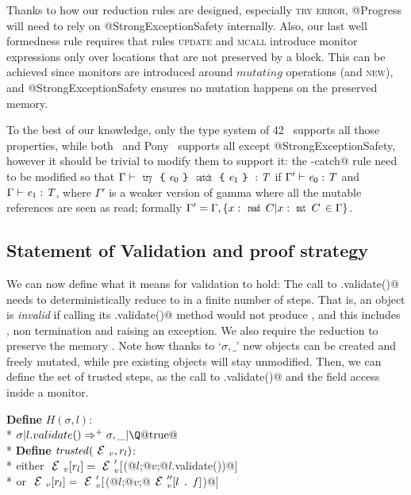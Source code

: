 Thanks to how our reduction rules are designed, especially \textsc{try error},
@Progress will need to rely on @StrongExceptionSafety internally.
Also, our last well formedness rule requires that 
rules \textsc{update} and \textsc{mcall} introduce
monitor expressions only over locations
that are not preserved by a \Q@try@ block.
This can be achieved since monitors are introduced
around $\mathit{mutating}$ operations
(and \textsc{new}),
and @StrongExceptionSafety ensures no mutation happens on the preserved memory.

To the best of our knowledge, only the type system of 42~\cite{ServettoEtAl13a,ServettoZucca15}
 supports all those properties,
while both~\cite{GordonEtAl12} and Pony~\cite{clebsch2015deny} supports all except @StrongExceptionSafety,
however it should be trivial to modify them to support it:
the \Q@try-catch@ rule need to be modified so that
$\Gamma\vdash\Kw{try}\oC\e_0\cC\Kw{catch}\oC\e_1\cC:\T$
if $\Gamma'\vdash\e_0:\T$ and $\Gamma\vdash\e_1:\T$,
where $\Gamma'$ is a weaker version of gamma where all the mutable
references are seen as read; formally $\Gamma'=\Gamma,\{x:\Kw{read}\,C | x:\Kw{mut}\,C\,\in\Gamma\}$.

\subsection{Statement of Validation and proof strategy}

\noindent We can now define what it means for validation to hold:
The call to \Q@.validate()@ needs to deterministically reduce to \Q@true@ in a finite number
of steps. 
That is, an object is \emph{invalid} if calling its \Q@.validate()@
method would not produce \Q@true@, and this includes \Q@false@, non termination and raising an exception.
We also require the reduction to preserve the memory \Q@sigma@.
Note how thanks to `$\sigma,\_ $' new objects can be created and freely mutated, while 
pre existing objects will stay unmodified.
Then, we can define the set of trusted steps, 
as the call to \Q@.validate()@ and the field access inside a monitor.

\noindent\textbf{Define} $H(\sigma,l)$:\\*
${}_{}$\quad\quad$\sigma | l.validate()\Rightarrow^+ \sigma,\_ | \text{\Q@true@}$\\*
\noindent\textbf{Define} $\mathit{trusted}(\ctx_v,r_l)$:\\*
${}_{}$\quad\quad either $\ctx_v[r_l]=\ctx_v'[$\Q@M(@$l$\Q@;@$v$\Q@;@$l$\Q@.validate())@$]$\\*
${}_{}$\quad\quad or $\ctx_v[r_l]=\ctx_v'[$\Q@M(@$l$\Q@;@$v$\Q@;@$\ctx_v''[l\singleDot\f]$\Q@)@$]$

